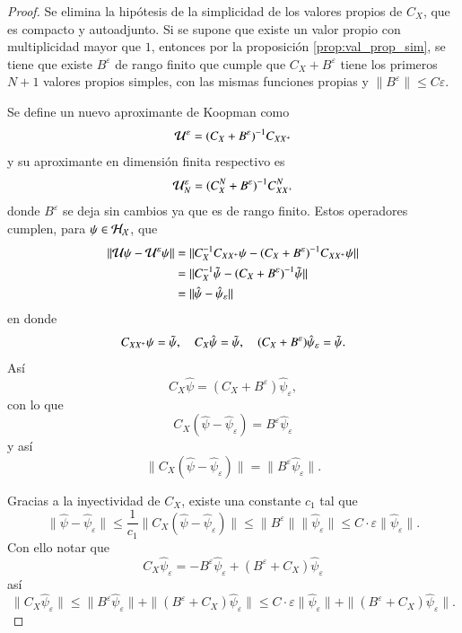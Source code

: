 \begin{proof}
    Se elimina la hipótesis de la simplicidad de los valores propios de $C_X$, que es compacto y autoadjunto. Si se supone que existe un valor propio con multiplicidad mayor que $1$, entonces por la proposición \ref{prop:val_prop_sim}, se tiene que existe $B^\varepsilon$ de rango finito que cumple que $C_X + B^\varepsilon$ tiene los primeros $N+1$ valores propios simples, con las mismas funciones propias y $\| B^\varepsilon \| \leq C \varepsilon$. 

    Se define un nuevo aproximante de Koopman como
    \[
    \mathcal{U}^\varepsilon = (C_X + B^\varepsilon)^{-1} C_{XX^+}
    \]
    y su aproximante en dimensión finita respectivo es
    \[
    \mathcal{U}^\varepsilon_N = (C_X^N + B^\varepsilon)^{-1} C_{XX^+}^N
    \]
    donde $B^\varepsilon$ se deja sin cambios ya que es de rango finito. Estos operadores cumplen, para $\psi \in \mathcal{H}_{\mathcal{X}}$, que
    \[
    \begin{aligned}
        \| \mathcal{U}\psi - \mathcal{U}^\varepsilon\psi \| & = \| C_X^{-1} C_{XX^+} \psi - (C_X + B^\varepsilon)^{-1} C_{XX^+} \psi \| \\
        & = \| C_X^{-1} \Tilde{\psi} - (C_X + B^\varepsilon)^{-1} \Tilde{\psi} \| \\
        & = \| \hat{\psi} - \hat{\psi}_\varepsilon \|
    \end{aligned} 
    \]
    en donde
    \[
    C_{XX^+}\psi = \Tilde{\psi}, \quad C_X \hat{\psi} =  \Tilde{\psi}, \quad (C_X + B^\varepsilon)\hat{\psi}_\varepsilon = \Tilde{\psi}.
    \]
    Así
    \[
    C_X \hat{\psi} = (C_X + B^\varepsilon)\hat{\psi}_\varepsilon,
    \]
    con lo que
    \[
    C_X (\hat{\psi} - \hat{\psi}_\varepsilon) = B^\varepsilon \hat{\psi}_\varepsilon
    \]
    y así
    \[
    \|C_X (\hat{\psi} - \hat{\psi}_\varepsilon)\| = \|B^\varepsilon \hat{\psi}_\varepsilon\|.
    \]

    Gracias a la inyectividad de $C_X$, existe una constante $c_1$ tal que 
    \[
    \| \hat{\psi} - \hat{\psi}_\varepsilon \| \leq \frac{1}{c_1} \| C_X (\hat{\psi} - \hat{\psi}_\varepsilon) \| \leq \| B^\varepsilon \| \| \hat{\psi}_\varepsilon \| \leq C \cdot \varepsilon \| \hat{\psi}_\varepsilon \|. 
    \]
    Con ello notar que
    \[
    C_X \hat{\psi}_\varepsilon  = -B^\varepsilon \hat{\psi}_\varepsilon  + (B^\varepsilon + C_X)\hat{\psi}_\varepsilon
    \]
    así
    \[
    \| C_X \hat{\psi}_\varepsilon \| \leq \| B^\varepsilon \hat{\psi}_\varepsilon \| + \| (B^\varepsilon + C_X)\hat{\psi}_\varepsilon\| \leq C \cdot \varepsilon  \| \hat{\psi}_\varepsilon \| + \| (B^\varepsilon + C_X)\hat{\psi}_\varepsilon\|. 
    \]
    

\end{proof}

